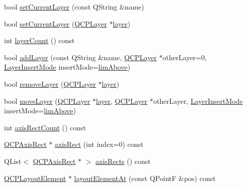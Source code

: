 \begin{DoxyCompactItemize}
\item 
bool \hyperlink{class_q_custom_plot_a73a6dc47c653bb6f8f030abca5a11852}{set\+Current\+Layer} (const Q\+String \&name)
\item 
bool \hyperlink{class_q_custom_plot_a23a4d3cadad1a0063c5fe19aac5659e6}{set\+Current\+Layer} (\hyperlink{class_q_c_p_layer}{Q\+C\+P\+Layer} $\ast$\hyperlink{class_q_custom_plot_aac492da01782820454e9136a8db28182}{layer})
\item 
int \hyperlink{class_q_custom_plot_a1b3926884f5bd4bdda1495d8b3c891d0}{layer\+Count} () const 
\item 
bool \hyperlink{class_q_custom_plot_ad5255393df078448bb6ac83fa5db5f52}{add\+Layer} (const Q\+String \&name, \hyperlink{class_q_c_p_layer}{Q\+C\+P\+Layer} $\ast$other\+Layer=0, \hyperlink{class_q_custom_plot_a75a8afbe6ef333b1f3d47abb25b9add7}{Layer\+Insert\+Mode} insert\+Mode=\hyperlink{class_q_custom_plot_a75a8afbe6ef333b1f3d47abb25b9add7a062b0b7825650b432a713c0df6742d41}{lim\+Above})
\item 
bool \hyperlink{class_q_custom_plot_a40f75e342c5eaab6a86066a42a0e2a94}{remove\+Layer} (\hyperlink{class_q_c_p_layer}{Q\+C\+P\+Layer} $\ast$\hyperlink{class_q_custom_plot_aac492da01782820454e9136a8db28182}{layer})
\item 
bool \hyperlink{class_q_custom_plot_ae896140beff19424e9e9e02d6e331104}{move\+Layer} (\hyperlink{class_q_c_p_layer}{Q\+C\+P\+Layer} $\ast$\hyperlink{class_q_custom_plot_aac492da01782820454e9136a8db28182}{layer}, \hyperlink{class_q_c_p_layer}{Q\+C\+P\+Layer} $\ast$other\+Layer, \hyperlink{class_q_custom_plot_a75a8afbe6ef333b1f3d47abb25b9add7}{Layer\+Insert\+Mode} insert\+Mode=\hyperlink{class_q_custom_plot_a75a8afbe6ef333b1f3d47abb25b9add7a062b0b7825650b432a713c0df6742d41}{lim\+Above})
\item 
int \hyperlink{class_q_custom_plot_a340fa24b1607e445cedda9685670ead3}{axis\+Rect\+Count} () const 
\item 
\hyperlink{class_q_c_p_axis_rect}{Q\+C\+P\+Axis\+Rect} $\ast$ \hyperlink{class_q_custom_plot_a4a37a1add5fe63060ac518cf0a4c4050}{axis\+Rect} (int index=0) const 
\item 
Q\+List$<$ \hyperlink{class_q_c_p_axis_rect}{Q\+C\+P\+Axis\+Rect} $\ast$ $>$ \hyperlink{class_q_custom_plot_afd67094aaeccbc5719761348b2d8c891}{axis\+Rects} () const 
\item 
\hyperlink{class_q_c_p_layout_element}{Q\+C\+P\+Layout\+Element} $\ast$ \hyperlink{class_q_custom_plot_a840458186d4483c8a42d6a399448d38f}{layout\+Element\+At} (const Q\+Point\+F \&pos) const 

\end{DoxyCompactItemize}
